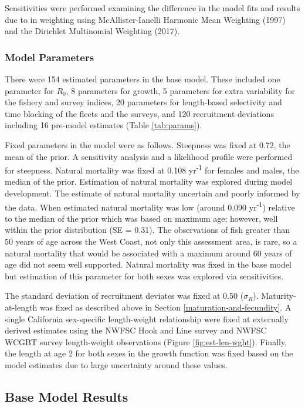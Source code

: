 \documentclass[11pt,
  english,
  letterpaper,
]{article}
\begin{document}
Sensitivities were performed examining the difference in the model fits and results due to in weighting using McAllister-Ianelli Harmonic Mean Weighting (1997) and the Dirichlet Multinomial Weighting (2017).

\hypertarget{model-parameters}{%
\subsubsection{Model Parameters}\label{model-parameters}}

There were 154 estimated parameters in the base model. These included one parameter for \(R_0\), 8 parameters for growth, 5 parameters for extra variability for the fishery and survey indices, 20 parameters for length-based selectivity and time blocking of the fleets and the surveys, and 120 recruitment deviations including 16 pre-model estimates (Table \ref{tab:params}).

Fixed parameters in the model were as follows. Steepness was fixed at 0.72, the mean of the prior. A sensitivity analysis and a likelihood profile were performed for steepness. Natural mortality was fixed at 0.108 yr\textsuperscript{-1} for females and males, the median of the prior. Estimation of natural mortality was explored during model development. The estimate of natural mortality uncertain and poorly informed by the data. When estimated natural mortality was low (around 0.090 yr\textsuperscript{-1}) relative to the median of the prior which was based on maximum age; however, well within the prior distribution (SE = 0.31). The observations of fish greater than 50 years of age across the West Coast, not only this assessment area, is rare, so a natural mortality that would be associated with a maximum around 60 years of age did not seem well supported. Natural mortality was fixed in the base model but estimation of this parameter for both sexes was explored via sensitivities.

The standard deviation of recruitment deviates was fixed at 0.50 (\(\sigma_R\)). Maturity-at-length was fixed as described above in Section \ref{maturation-and-fecundity}. A single California sex-specific length-weight relationship were fixed at externally derived estimates using the NWFSC Hook and Line survey and NWFSC WCGBT survey length-weight observations (Figure \ref{fig:est-len-wght}). Finally, the length at age 2 for both sexes in the growth function was fixed based on the model estimates due to large uncertainty around these values.

\hypertarget{base-model-results}{%
\subsection{Base Model Results}\label{base-model-results}}
\end{document}
